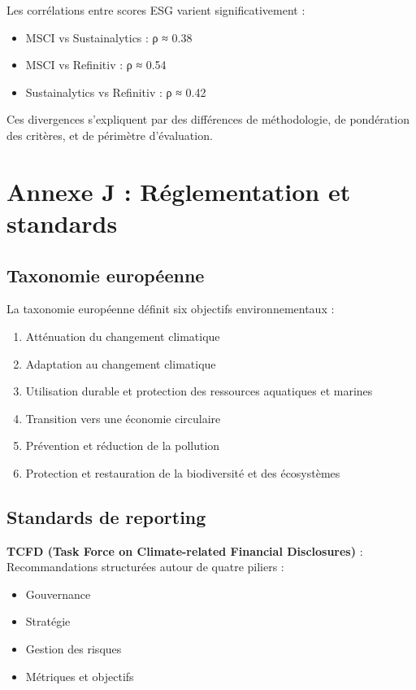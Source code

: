 Les corrélations entre scores ESG varient significativement :
\begin{itemize}
\item MSCI vs Sustainalytics : ρ ≈ 0.38
\item MSCI vs Refinitiv : ρ ≈ 0.54
\item Sustainalytics vs Refinitiv : ρ ≈ 0.42
\end{itemize}

Ces divergences s'expliquent par des différences de méthodologie, de pondération des critères, et de périmètre d'évaluation.

\section{Annexe J : Réglementation et standards}

\subsection{Taxonomie européenne}

La taxonomie européenne définit six objectifs environnementaux :
\begin{enumerate}
\item Atténuation du changement climatique
\item Adaptation au changement climatique
\item Utilisation durable et protection des ressources aquatiques et marines
\item Transition vers une économie circulaire
\item Prévention et réduction de la pollution
\item Protection et restauration de la biodiversité et des écosystèmes
\end{enumerate}

\subsection{Standards de reporting}

\textbf{TCFD (Task Force on Climate-related Financial Disclosures)} : Recommandations structurées autour de quatre piliers :
\begin{itemize}
\item Gouvernance
\item Stratégie
\item Gestion des risques
\item Métriques et objectifs
\end{itemize}

